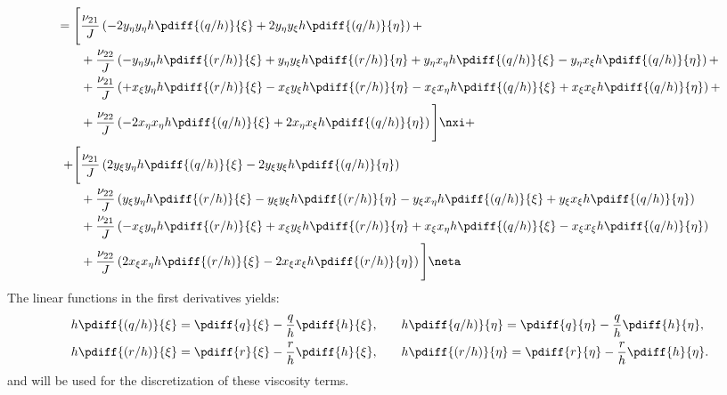 \begin{align}
= \Bigg[ &
\frac{\nu_{21}}{J} \left(
- 2 y_{\eta} y_{\eta} h \pdiff{(q/h)}{\xi}
+ 2 y_{\eta} y_{\xi} h \pdiff{(q/h)}{\eta}
\right)
+
\\
& + \frac{\nu_{22}}{J} \left(
- y_{\eta} y_{\eta} h \pdiff{(r/h)}{\xi}
+ y_{\eta} y_{\xi} h \pdiff{(r/h)}{\eta}
+ y_{\eta} x_{\eta} h \pdiff{(q/h)}{\xi}
- y_{\eta} x_{\xi} h \pdiff{(q/h)}{\eta}
\right)
+
\\
& + \frac{\nu_{21}}{J} \left(
+ x_{\xi} y_{\eta} h \pdiff{(r/h)}{\xi}
- x_{\xi} y_{\xi} h \pdiff{(r/h)}{\eta}
- x_{\xi} x_{\eta} h \pdiff{(q/h)}{\xi}
+ x_{\xi} x_{\xi} h \pdiff{(q/h)}{\eta}
\right)
+
\\
& + \frac{\nu_{22}}{J} \left(
- 2 x_{\eta} x_{\eta} h \pdiff{(q/h)}{\xi}
+ 2 x_{\eta} x_{\xi} h \pdiff{(q/h)}{\eta}
\right)
\Bigg] \nxi +
\\
+ \Bigg[ &
\frac{\nu_{21}}{J} \left(
  2 y_{\xi} y_{\eta} h \pdiff{(q/h)}{\xi}
- 2 y_{\xi} y_{\xi} h \pdiff{(q/h)}{\eta}
\right)
\\* & +
\frac{\nu_{22}}{J} \left(
  y_{\xi}y_{\eta} h \pdiff{(r/h)}{\xi}
- y_{\xi}y_{\xi} h \pdiff{(r/h)}{\eta}
- y_{\xi}x_{\eta} h \pdiff{(q/h)}{\xi}
+ y_{\xi}x_{\xi} h \pdiff{(q/h)}{\eta}
\right)
\\* & +
\frac{\nu_{21}}{J} \left(
- x_{\xi}y_{\eta} h \pdiff{(r/h)}{\xi}
+ x_{\xi}y_{\xi} h \pdiff{(r/h)}{\eta}
+ x_{\xi}x_{\eta} h \pdiff{(q/h)}{\xi}
- x_{\xi}x_{\xi} h \pdiff{(q/h)}{\eta}
\right)
\\* & +
\frac{\nu_{22}}{J} \left(
2 x_{\xi}x_{\eta} h \pdiff{(r/h)}{\xi}
- 2 x_{\xi}x_{\xi} h \pdiff{(r/h)}{\eta}
\right)
\Bigg] \neta
\label{eq:eta_greens_viscous_term}
\end{align}
%
The linear functions in the first derivatives yields:
\begin{align}
    h \pdiff{(q/h)}{\xi} = \pdiff{q}{\xi} - \frac{q}{h}\pdiff{h}{\xi},
    & \qquad h \pdiff{q/h)}{\eta} = \pdiff{q}{\eta} - \frac{q}{h}\pdiff{h}{\eta},
    \\*
    h \pdiff{(r/h)}{\xi} = \pdiff{r}{\xi} - \frac{r}{h}\pdiff{h}{\xi},
    & \qquad h\pdiff{(r/h)}{\eta} = \pdiff{r}{\eta} - \frac{r}{h}\pdiff{h}{\eta}.
\end{align}
and will be used for the discretization of these viscosity terms.

